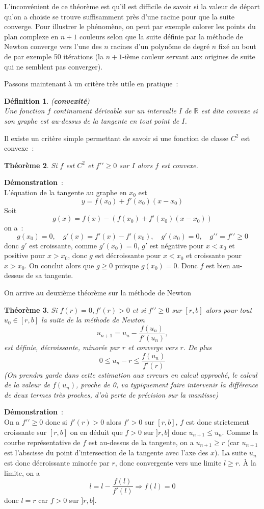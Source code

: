 \documentclass[a4paper,11pt]{article}
\newtheorem{thm}{Théorème}
\newtheorem{defn}[thm]{D\'efinition}
\newcommand{\R}{{\mathbb{R}}}
\begin{document}
\begin{giacjshere}
L'inconvénient de ce th\'eor\`eme
est qu'il est difficile de savoir si la valeur de départ qu'on
a choisie se trouve suffisamment près d'une racine pour que
la suite converge. Pour illustrer le phénomène, 
on peut par exemple colorer les points du plan
complexe en $n+1$ couleurs selon que la suite définie par la méthode
de Newton converge vers l'une des $n$ racines d'un polynôme de degré
$n$ fixé au bout de par exemple 50 itérations (la $n+1$-ième couleur
servant aux origines de suite qui ne semblent pas converger).

Passons maintenant à un critère tr\`es utile en pratique~:
\begin{defn} ({\bf convexité})\\
Une fonction $f$ continument dérivable sur un intervalle $I$ de $\R$
est dite convexe si son graphe est au-dessus de la tangente en tout point
de $I$.
\end{defn}
Il existe un crit\`ere simple permettant de savoir si
une fonction de classe $C^2$ est convexe~:
\begin{thm}
Si $f$ est $C^2$ et $f'{'} \geq 0$ sur $I$ alors $f$ est convexe.
\end{thm}
{\bf Démonstration}~:\\
L'équation de la tangente au graphe en $x_0$ est 
\[ y=f(x_0)+f'(x_0)(x-x_0) \]
Soit
\[ g(x)=f(x)-(f(x_0)+f'(x_0)(x-x_0)) \]
on a~:
\[ g(x_0)=0, \quad g'(x)=f'(x)-f'(x_0), \quad g'(x_0)=0, 
\quad g'{'}=f'{'} \geq 0 \]
donc $g'$ est croissante, comme $g'(x_0)=0$, $g'$ est négative
pour $x<x_0$ et positive pour $x>x_0$, donc $g$ est décroissante
pour $x<x_0$ et croissante pour $x>x_0$. On conclut alors que
$g \geq 0$ puisque $g(x_0)=0$. Donc $f$ est bien au-dessus
de sa tangente.

On arrive au deuxième théorème sur la méthode de Newton
\begin{thm} 
Si $f(r)=0, f'(r)>0$ et si $f'{'} \geq 0$ sur $[r,b]$ alors
pour tout $u_0 \in [r,b]$ la suite de la méthode de Newton
\[ u_{n+1} = u_n -\frac{f(u_n)}{f'(u_n)},  \]
est définie, décroissante, minorée par $r$ et converge vers 
$r$. De plus
\[ 0 \leq u_n -r \leq \frac{f(u_n)}{f'(r)} \]
(On prendra garde dans cette estimation aux erreurs en calcul
approch\'e, le calcul de la valeur de $f(u_n)$, proche de 0, va typiquement
faire intervenir la diff\'erence de deux termes tr\`es proches,
d'o\`u perte de pr\'ecision sur la mantisse)
\end{thm}

{\bf Démonstration}~:\\
On a $f'{'} \geq 0$ donc si $f'(r)>0$ alors $f'>0$
sur $[r,b]$, $f$ est donc strictement croissante sur $[r,b]$
on en déduit que $f>0$ sur $]r,b]$ donc $u_{n+1} \leq u_n$.
Comme la courbe représentative de $f$ est au-dessus de la tangente,
on a $u_{n+1} \geq r$ (car $u_{n+1}$ est l'abscisse du point
d'intersection de la tangente avec l'axe des $x$). 
La suite $u_n$ est donc décroissante minorée par $r$, donc convergente
vers une limite $l\geq r$. \`A la limite, on a 
\[ l=l-\frac{f(l)}{f'(l)} \Rightarrow f(l)=0 \]
donc $l=r$ car $f>0$ sur $]r,b]$.


\end{giacjshere}
\end{document}
